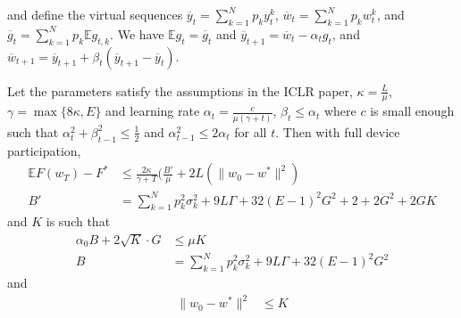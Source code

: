 and define the virtual sequences $\overline{y}_{t}=\sum_{k=1}^{N}p_{k}y_{t}^{k}$,
$\overline{w}_{t}=\sum_{k=1}^{N}p_{k}w_{t}^{k}$, and $\overline{g}_{t}=\sum_{k=1}^{N}p_{k}\mathbb{E}g_{t,k}$.
We have $\mathbb{E}g_{t}=\overline{g}_{t}$ and $\overline{y}_{t+1}=\overline{w}_{t}-\alpha_{t}g_{t}$,
and $\overline{w}_{t+1}=\overline{y}_{t+1}+\beta_{t}(\overline{y}_{t+1}-\overline{y}_{t})$. 
\begin{theorem}
	Let the parameters satisfy the assumptions in the ICLR paper, $\kappa=\frac{L}{\mu}$,
	$\gamma=\max\{8\kappa,E\}$ and learning rate $\alpha_{t}=\frac{c}{\mu(\gamma+t)}$,
	$\beta_{t}\leq\alpha_{t}$ where $c$ is small enough such that $\alpha_{t}^{2}+\beta_{t-1}^{2}\leq\frac{1}{2}$
	and $\alpha_{t-1}^{2}\leq2\alpha_{t}$ for all $t$. Then with full
	device participation, 
	\begin{align*}
	\mathbb{E}F(w_{T})-F^{\ast} & \leq\frac{2\kappa}{\gamma+T}(\frac{B'}{\mu}+2L(\|w_{0}-w^{\ast}\|^{2})\\
	B' & =\sum_{k=1}^{N}p_{k}^{2}\sigma_{k}^{2}+9L\Gamma+32(E-1)^{2}G^{2}+2+2G^{2}+2GK
	\end{align*}
	and $K$ is such that 
	\begin{align*}
	\alpha_{0}B+2\sqrt{K}\cdot G & \leq\mu K\\
	B & =\sum_{k=1}^{N}p_{k}^{2}\sigma_{k}^{2}+9L\Gamma+32(E-1)^{2}G^{2}
	\end{align*}
	and
	\begin{align*}
	\|w_{0}-w^{\ast}\|^{2} & \leq K
	\end{align*}
\end{theorem}
